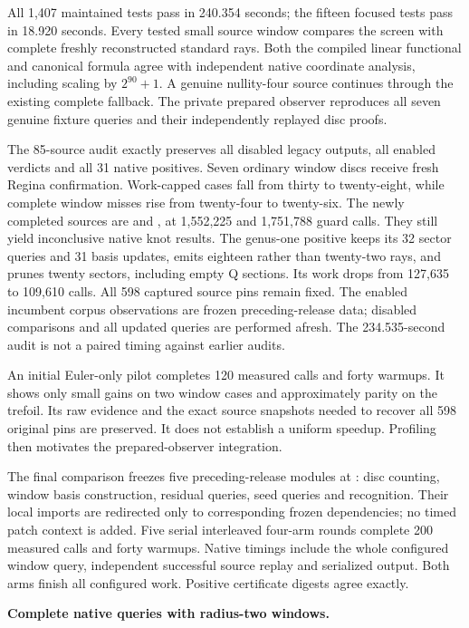 All 1,407 maintained tests pass in 240.354 seconds; the fifteen focused
tests pass in 18.920 seconds. Every tested small source window compares
the screen with complete freshly reconstructed standard rays. Both the
compiled linear functional and canonical formula agree with independent
native coordinate analysis, including scaling by $2^{90}+1$.
A genuine nullity-four source continues through the existing complete
fallback. The private prepared observer reproduces all seven genuine
fixture queries and their independently replayed disc proofs.

The 85-source audit exactly preserves all disabled legacy outputs, all
enabled verdicts and all 31 native positives. Seven ordinary window discs
receive fresh Regina confirmation. Work-capped cases fall from thirty to
twenty-eight, while complete window misses rise from twenty-four to
twenty-six. The newly completed sources are  and
, at 1,552,225 and 1,751,788 guard calls. They still yield
inconclusive native knot results. The genus-one positive keeps its 32
sector queries and 31 basis updates, emits eighteen rather than twenty-two
rays, and prunes twenty sectors, including empty Q sections. Its work drops
from 127,635 to 109,610 calls. All 598 captured source pins remain fixed.
The enabled incumbent corpus observations are frozen preceding-release data;
disabled comparisons and all updated queries are performed afresh.
The 234.535-second audit is not a paired timing against earlier audits.

An initial Euler-only pilot completes 120 measured calls and forty warmups.
It shows only small gains on two window cases and approximately parity on
the trefoil. Its raw evidence and the exact source snapshots needed to
recover all 598 original pins are preserved. It does not establish a
uniform speedup. Profiling then motivates the prepared-observer integration.

The final comparison freezes five preceding-release modules at
: disc counting, window basis construction, residual queries,
seed queries and recognition. Their local imports are redirected only to
corresponding frozen dependencies; no timed patch context is added.
Five serial interleaved four-arm rounds complete 200 measured calls and
forty warmups. Native timings include the whole configured window query,
independent successful source replay and serialized output. Both arms
finish all configured work. Positive certificate digests agree exactly.

\begin{samepage}
\noindent\textbf{Complete native queries with radius-two windows.}

\end{samepage}


